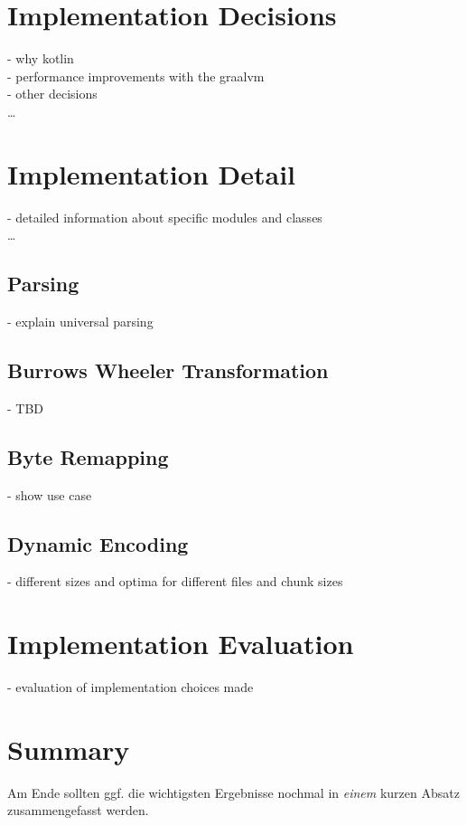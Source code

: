 \section{Implementation Decisions}
\label{ch:Conceptual Design:sec:Implementation Decisions}
- why kotlin\\
- performance improvements with the graalvm\\
- other decisions\\
\ldots

\section{Implementation Detail}
\label{ch:Conceptual Design:sec:Implementation Detail}
- detailed information about specific modules and classes\\
\ldots


\subsection{Parsing}
- explain universal parsing\\
\subsection{Burrows Wheeler Transformation}
- TBD\\
\subsection{Byte Remapping}
- show use case \\
\subsection{Dynamic Encoding}
- different sizes and optima for different files and chunk sizes \\


\section{Implementation Evaluation}
\label{ch:Conceptual Design:sec:Implementation Evaluation}
- evaluation of implementation choices made


\section{Summary}
\label{ch:Conceptual Design:sec:Summary}

Am Ende sollten ggf. die wichtigsten Ergebnisse nochmal in \emph{einem}
kurzen Absatz zusammengefasst werden.

